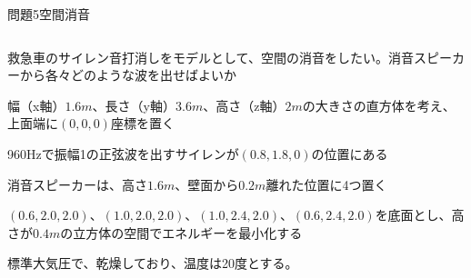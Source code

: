 \documentclass[dvipdfmx]{beamer}
\newenvironment{wideitemize}{\itemize\setlength{\itemsep}{1em}}{\enditemize}
\newenvironment{wideitemize2}{\itemize\setlength{\itemsep}{0.2em}}{\enditemize}
\begin{document}

\begin{frame}{問題5}{空間消音}
\begin{columns}[t]
\begin{column}{0.7\textwidth}
\begin{wideitemize}
	\item 救急車のサイレン音打消しをモデルとして、空間の消音をしたい。消音スピーカーから各々どのような波を出せばよいか
	\begin{wideitemize2}
		\item 幅（x軸）$1.6m$、長さ（y軸）$3.6m$、高さ（z軸）$2m$の大きさの直方体を考え、上面端に$(0, 0, 0)$座標を置く
		\item 960Hzで振幅1の正弦波を出すサイレンが$(0.8,1.8,0)$の位置にある
		\item 消音スピーカーは、高さ$1.6m$、壁面から$0.2m$離れた位置に4つ置く
		\item $(0.6, 2.0, 2.0)$、$(1.0, 2.0, 2.0)$、$(1.0, 2.4, 2.0)$、$(0.6, 2.4, 2.0)$を底面とし、高さが$0.4m$の立方体の空間でエネルギーを最小化する
		\item 標準大気圧で、乾燥しており、温度は20度とする。
	\end{wideitemize2}

\end{wideitemize}


\end{column}
\end{columns}
\end{frame}
\end{document}
